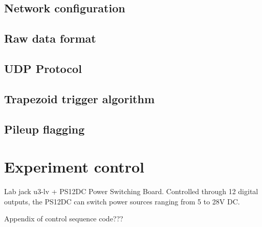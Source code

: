 
\subsection{Network configuration}



\subsection{Raw data format}



\subsection{UDP Protocol}



\subsection{Trapezoid trigger algorithm}



\subsection{Pileup flagging}



\section{Experiment control}


Lab jack u3-lv + PS12DC Power Switching Board. Controlled through 12 digital outputs, the PS12DC can switch power sources ranging from 5 to 28V DC.

Appendix of control sequence code???

